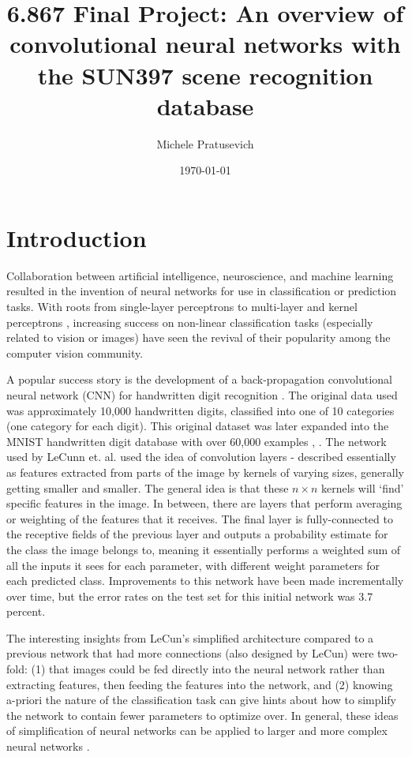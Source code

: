 \documentclass[10pt]{article}
\begin{document}
\title{6.867 Final Project: An overview of convolutional neural networks with the SUN397 scene recognition database}
\author{Michele Pratusevich}
\date{\today}
\maketitle

\section{Introduction}

Collaboration between artificial intelligence, neuroscience, and machine learning resulted in the invention of neural networks for use in classification or prediction tasks. With roots from single-layer perceptrons \cite{rosenblatt_perceptron:_1958} to multi-layer and kernel perceptrons \cite{aizerman_theoretical_1964}, increasing success on non-linear classification tasks (especially related to vision or images) have seen the revival of their popularity among the computer vision community. 

A popular success story is the development of a back-propagation convolutional neural network (CNN) for handwritten digit recognition \cite{lecun_handwritten_1990}. The original data used was approximately 10,000 handwritten digits, classified into one of 10 categories (one category for each digit). This original dataset was later expanded into the MNIST handwritten digit database with over 60,000 examples \cite{lecun_gradient-based_1998}, \cite{li_deng_mnist_2012}. The network used by LeCunn et. al. used the idea of convolution layers - described essentially as features extracted from parts of the image by kernels of varying sizes, generally getting smaller and smaller. The general idea is that these $n \times n$ kernels will `find' specific features in the image. In between, there are layers that perform averaging or weighting of the features that it receives. The final layer is fully-connected to the receptive fields of the previous layer and outputs a probability estimate for the class the image belongs to, meaning it essentially performs a weighted sum of all the inputs it sees for each parameter, with different weight parameters for each predicted class. Improvements to this network have been made incrementally over time, but the error rates on the test set for this initial network was $3.7$ percent. 

The interesting insights from LeCun's simplified architecture \cite{lecun_handwritten_1990} compared to a previous network that had more connections (also designed by LeCun) \cite{lecun_backpropagation_1989} were two-fold: (1) that images could be fed directly into the neural network rather than extracting features, then feeding the features into the network, and (2) knowing a-priori the nature of the classification task can give hints about how to simplify the network to contain fewer parameters to optimize over. In general, these ideas of simplification of neural networks can be applied to larger and more complex neural networks \cite{lecun_optimal_1989}. 
\end{document}
